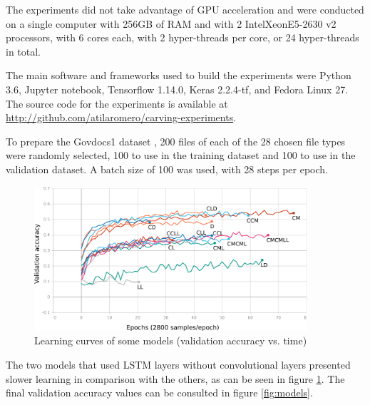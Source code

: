 The experiments did not take advantage of GPU acceleration and were  conducted on a single computer with 256GB of RAM and with 2 Intel\textregistered Xeon\textregistered E5-2630 v2 processors, with 6 cores each, with 2 hyper-threads per core, or 24 hyper-threads in total. 

The main software and frameworks used to build the experiments were Python 3.6, Jupyter notebook, Tensorflow 1.14.0, Keras 2.2.4-tf, and Fedora Linux 27.
The source code for the experiments is available at \sloppy\url{http://github.com/atilaromero/carving-experiments}.

To prepare the Govdocs1 dataset \cite{garfinkel_bringing_2009}, 200 files of each of the 28 chosen file types were randomly selected, 100 to use in the training dataset and 100 to use in the validation dataset.
A batch size of 100 was used, with 28 steps per epoch.

\noindent
\begin{figure}[htb!]
\centering\includegraphics[width=0.9\textwidth]{content/epoch_val_categorical_accuracy.png}
\caption{\label{fig:learning}Learning curves of some models (validation accuracy vs. time)}%
\end{figure}

The two models that used LSTM layers without convolutional layers presented slower learning in comparison with the others, as can be seen in figure \ref{fig:learning}. The final validation accuracy values can be consulted in figure \ref{fig:models}.

